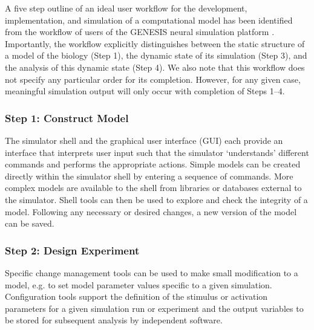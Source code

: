 \documentclass[12pt]{article}
\begin{document}

A five step outline of an ideal user workflow for the development,
implementation, and simulation of a computational model has been
identified from the workflow of users of the GENESIS neural simulation
platform \cite{cornelis02:_tutor}.  Importantly, the workflow
explicitly distinguishes between the static structure of a model of
the biology (Step 1), the dynamic state of its simulation (Step 3),
and the analysis of this dynamic state (Step 4). We also note that
this workflow does not specify any particular order for its
completion. However, for any given case, meaningful simulation output
will only occur with completion of Steps 1--4.

\subsubsection*{Step 1: Construct Model}

The simulator shell and the graphical user interface (GUI) each
provide an interface that interprets user input such that the
simulator `understands' different commands and performs the
appropriate actions. Simple models can be created directly within the
simulator shell by entering a sequence of commands. More complex
models are available to the shell from libraries or databases external
to the simulator. Shell tools can then be used to explore and check
the integrity of a model. Following any necessary or desired changes,
a new version of the model can be saved.

\subsubsection*{Step 2: Design Experiment}

Specific change management tools can be used to make small
modification to a model, e.g. to set model parameter values specific
to a given simulation.  Configuration tools support the definition of
the stimulus or activation parameters for a given simulation run or
experiment and the output variables to be stored for subsequent
analysis by independent software.
\end{document}

